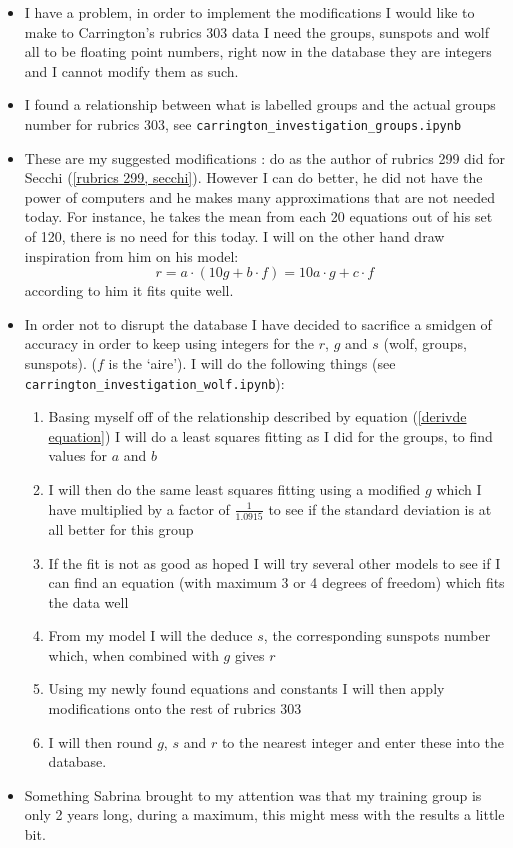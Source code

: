 \documentclass[12pt]{article}
\begin{document}
\begin{itemize}
\item I have a problem, in order to implement the modifications I would like to make to Carrington's rubrics 303 data I need the groups, sunspots and wolf all to be floating point numbers, right now in the database they are integers and I cannot modify them as such.
\item I found a relationship between what is labelled groups and the actual groups number for rubrics 303, see \texttt{carrington\_investigation\_groups.ipynb}
\item These are my suggested modifications : do as the author of rubrics 299 did for Secchi (\ref{rubrics 299, secchi}). However I can do better, he did not have the power of computers and he makes many approximations that are not needed today. For instance, he takes the mean from each 20 equations out of his set of 120, there is no need for this today. I will on the other hand draw inspiration from him on his model:
$$r = a\cdot(10 g + b\cdot f) = 10 a\cdot g + c\cdot f$$
according to him it fits quite well.
\item In order not to disrupt the database I have decided to sacrifice a smidgen of accuracy in order to keep using integers for the $r$, $g$ and $s$ (wolf, groups, sunspots). ($f$ is the `aire'). I will do the following things (see \texttt{carrington\_investigation\_wolf.ipynb}):
\begin{enumerate}
    \item Basing myself off of the relationship described by equation (\ref{derivde equation}) I will do a least squares fitting as I did for the groups, to find values for $a$ and $b$
    \item I will then do the same least squares fitting using a modified $g$ which I have multiplied by a factor of $\frac{1}{1.0915}$ to see if the standard deviation is at all better for this group
    \item If the fit is not as good as hoped I will try several other models to see if I can find an equation (with maximum 3 or 4 degrees of freedom) which fits the data well
    \item From my model I will the deduce $s$, the corresponding sunspots number which, when combined with $g$ gives $r$
    \item Using my newly found equations and constants I will then apply modifications onto the rest of rubrics 303
    \item I will then round $g$, $s$ and $r$ to the nearest integer and enter these into the database.
\end{enumerate}
\item Something Sabrina brought to my attention was that my training group is only 2 years long, during a maximum, this might mess with the results a little bit.
\end{itemize}
\end{document}
